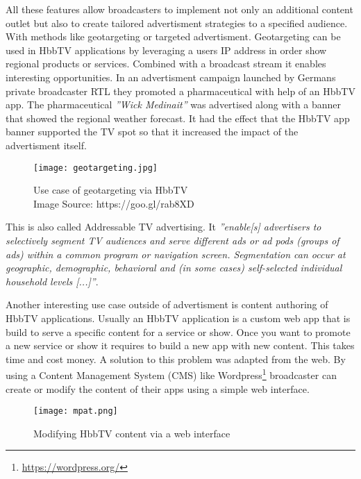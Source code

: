 All these features allow broadcasters to implement not only an additional content outlet but also
to create tailored advertisment strategies to a specified audience. With methods like geotargeting
or targeted advertisment. Geotargeting can be used in HbbTV applications by leveraging a users
IP address in order show regional products or services. Combined with a broadcast stream it
enables interesting opportunities. In an advertisment campaign launched by Germans private
broadcaster RTL they promoted a pharmaceutical with help of an HbbTV app. The pharmaceutical
\textit{''Wick Medinait''} was advertised along with a banner that showed the regional weather
forecast. It had the effect that the HbbTV app banner supported the TV spot so that it increased
the impact of the advertisment itself.

\begin{figure}[htb]
  \centering
  \texttt{[image: geotargeting.jpg]}\\
  \caption{
    Use case of geotargeting via HbbTV\\
    {\tiny Image Source: https://goo.gl/rab8XD}
  }
  \label{fig:geotargeting}
\end{figure}

This is also called Addressable TV advertising. It \textit{''enable[s] advertisers to selectively
segment TV audiences and serve different ads or ad pods (groups of ads) within a common program or
navigation screen. Segmentation can occur at geographic, demographic, behavioral and (in some cases)
self-selected individual household levels [...]''}\cite{adrTV}.

Another interesting use case outside of advertisment is content authoring of HbbTV applications.
Usually an HbbTV application is a custom web app that is build to serve a specific content for
a service or show. Once you want to promote a new service or show it requires to build a new
app with new content. This takes time and cost money. A solution to this problem was adapted from
the web. By using a Content Management System (CMS) like Wordpress\footnote{\url{https://wordpress.org/}}
broadcaster can create or modify the content of their apps using a simple web interface.

\begin{figure}[htb]
  \centering
  \texttt{[image: mpat.png]}\\
  \caption{
    Modifying HbbTV content via a web interface
  }
  \label{fig:mpat}
\end{figure}

